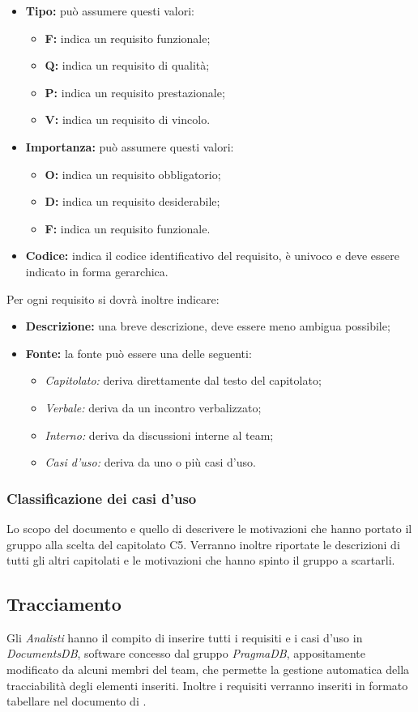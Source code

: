 \begin{itemize} 
  \item \textbf{Tipo:} può assumere questi valori:
  \begin{itemize}
    \item \textbf{F:} indica un requisito funzionale;
    \item \textbf{Q:} indica un requisito di qualità;
    \item \textbf{P:} indica un requisito prestazionale;
    \item \textbf{V:} indica un requisito di vincolo.
  \end{itemize}
  \item \textbf{Importanza:} può assumere questi valori:
  \begin{itemize}
    \item \textbf{O:} indica un requisito obbligatorio;
    \item \textbf{D:} indica un requisito desiderabile;
    \item \textbf{F:} indica un requisito funzionale.
  \end{itemize}
  \item \textbf{Codice:} indica il codice identificativo del requisito, è 
  univoco e deve essere indicato in forma gerarchica.
\end{itemize}
Per ogni requisito si dovrà inoltre indicare: 
\begin{itemize}
  \item \textbf{Descrizione:} una breve descrizione, deve essere meno ambigua possibile;
  \item \textbf{Fonte:} la fonte può essere una delle seguenti:
  \begin{itemize}
    \item \textsl{Capitolato:} deriva direttamente dal testo del capitolato;
    \item \textsl{Verbale:} deriva da un incontro verbalizzato;
    \item \textsl{Interno:} deriva da discussioni interne al team;
    \item \textsl{Casi d'uso:} deriva da uno o più casi d'uso.
  \end{itemize}
\end{itemize} 
\subsubsection{Classificazione dei casi d'uso}
Lo scopo del documento e quello di descrivere le motivazioni che hanno portato il gruppo alla scelta del capitolato C5.
Verranno inoltre riportate le descrizioni di tutti gli altri capitolati e le motivazioni che hanno spinto il gruppo a scartarli.

\subsection{Tracciamento}
Gli \textsl{Analisti} hanno il compito di inserire tutti i requisiti e i casi d'uso in \textsl{DocumentsDB},
software concesso dal gruppo \textsl{PragmaDB}, appositamente modificato da alcuni membri del 
team, che permette la gestione automatica della tracciabilità degli elementi inseriti. 
Inoltre i requisiti verranno inseriti in formato tabellare nel documento di \textsl{\AdR}.
